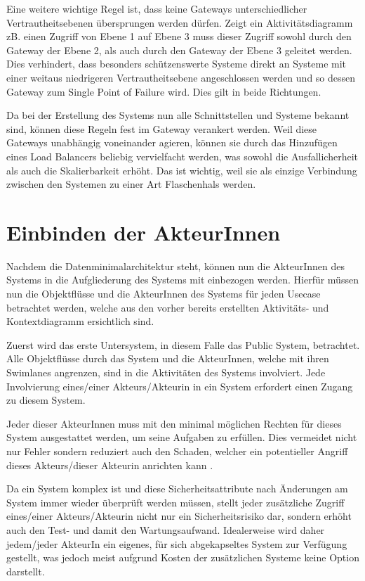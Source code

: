 Eine weitere wichtige Regel ist, dass keine Gateways unterschiedlicher Vertrautheitsebenen übersprungen werden dürfen. Zeigt ein Aktivitätsdiagramm zB. einen Zugriff von Ebene 1 auf Ebene 3 muss dieser Zugriff sowohl durch den Gateway der Ebene 2, als auch durch den Gateway der Ebene 3 geleitet werden. Dies verhindert, dass besonders schützenswerte Systeme direkt an Systeme mit einer weitaus niedrigeren Vertrautheitsebene angeschlossen werden und so dessen Gateway zum Single Point of Failure wird. Dies gilt in beide Richtungen.

Da bei der Erstellung des Systems nun alle Schnittstellen und Systeme bekannt sind, können diese Regeln fest im Gateway verankert werden. Weil diese Gateways unabhängig voneinander agieren, können sie durch das Hinzufügen eines Load Balancers beliebig vervielfacht werden, was sowohl die Ausfallicherheit als auch die Skalierbarkeit erhöht. Das ist wichtig, weil sie als einzige Verbindung zwischen den Systemen zu einer Art Flaschenhals werden.

\section{Einbinden der AkteurInnen}
Nachdem die Datenminimalarchitektur steht, können nun die AkteurInnen des Systems in die Aufgliederung des Systems mit einbezogen werden. Hierfür müssen nun die Objektflüsse und die AkteurInnen des Systems für jeden Usecase betrachtet werden, welche aus den vorher bereits erstellten Aktivitäts- und Kontextdiagramm ersichtlich sind.

Zuerst wird das erste Untersystem, in diesem Falle das Public System, betrachtet. Alle Objektflüsse durch das System und die AkteurInnen, welche mit ihren Swimlanes angrenzen, sind in die Aktivitäten des Systems involviert. Jede Involvierung eines/einer Akteurs/Akteurin in ein System erfordert einen Zugang zu diesem System.

Jeder dieser AkteurInnen muss mit den minimal möglichen Rechten für dieses System ausgestattet werden, um seine Aufgaben zu erfüllen. Dies vermeidet nicht nur Fehler sondern reduziert auch den Schaden, welcher ein potentieller Angriff dieses Akteurs/dieser Akteurin anrichten kann \cite[1. A]{leastpriv}.

Da ein System komplex ist \cite[S. 7]{softarch} und diese Sicherheitsattribute nach Änderungen am System immer wieder überprüft werden müssen, stellt jeder zusätzliche Zugriff eines/einer Akteurs/Akteurin nicht nur ein Sicherheitsrisiko dar, sondern erhöht auch den Test- und damit den Wartungsaufwand. Idealerweise wird daher jedem/jeder AkteurIn ein eigenes, für sich abgekapseltes System zur Verfügung gestellt, was jedoch meist aufgrund Kosten der zusätzlichen Systeme keine Option darstellt.


